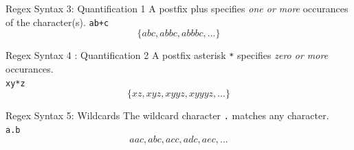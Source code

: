 \documentclass[11pt]{beamer}
\begin{document}
\begin{frame}[fragile=singleslide]{Regex Syntax 3: Quantification 1}
\center
A postfix plus specifies \emph{one or more} occurances of the character(s). 
\texttt{ab+c} \\
\vspace{0.5em}
$$ \{ abc, abbc, abbbc, ...\} $$ 
\end{frame}

\begin{frame}{Regex Syntax 4 : Quantification 2}
\center
A postfix asterisk \texttt{\**} specifies \emph{zero or more} occurances. \\ 
\texttt{xy*z}
$$ \{ xz, xyz, xyyz, xyyyz, ... \} $$
\end{frame}

\begin{frame}{Regex Syntax 5: Wildcards}
\center
The wildcard character \texttt{.} matches any character. \\
\texttt{a.b}
$$ {aac, abc, acc, adc, aec, ...} $$
\end{frame}
\end{document}
